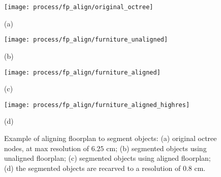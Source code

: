 \documentclass[review]{acmsiggraph}
\begin{document}
\begin{figure}[t]

	\begin{minipage}[t]{0.48\linewidth}
		\centerline{\texttt{[image: process/fp\_align/original\_octree]}}
		\centerline{(a)}
	\end{minipage}
	\hfill
	\begin{minipage}[t]{0.48\linewidth}
		\centerline{\texttt{[image: process/fp\_align/furniture\_unaligned]}}
		\centerline{(b)}
	\end{minipage}
	
	\begin{minipage}[t]{0.48\linewidth}
		\centerline{\texttt{[image: process/fp\_align/furniture\_aligned]}}
		\centerline{(c)}
	\end{minipage}
	\hfill
	\begin{minipage}[t]{0.48\linewidth}
		\centerline{\texttt{[image: process/fp\_align/furniture\_aligned\_highres]}}
		\centerline{(d)}
	\end{minipage}
	
	\caption{Example of aligning floorplan to segment objects: (a) original octree nodes, at max resolution of $6.25$ cm; (b) segmented objects using unaligned floorplan; (c) segmented objects using aligned floorplan; (d) the segmented objects are recarved to a resolution of $0.8$ cm.}
	\label{fig:fp_align}
\end{figure}
\end{document}
